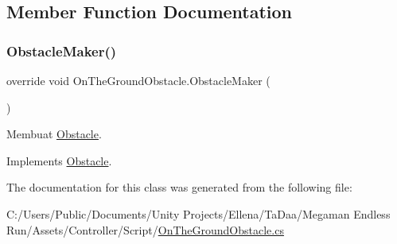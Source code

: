 \subsection{Member Function Documentation}
\hypertarget{class_on_the_ground_obstacle_a6c6123b29a6d6c2b78fa12ff72bf0834}{}\label{class_on_the_ground_obstacle_a6c6123b29a6d6c2b78fa12ff72bf0834} 
\subsubsection{\texorpdfstring{Obstacle\+Maker()}{ObstacleMaker()}}
{\footnotesize\ttfamily override void On\+The\+Ground\+Obstacle.\+Obstacle\+Maker (\begin{DoxyParamCaption}{ }\end{DoxyParamCaption})\hspace{0.3cm}{\ttfamily [virtual]}}



Membuat \hyperlink{class_obstacle}{Obstacle}. 



Implements \hyperlink{class_obstacle_a19f2f5d2c3176ee9ea8840862c55aa42}{Obstacle}.



The documentation for this class was generated from the following file\+:\begin{DoxyCompactItemize}
\item 
C\+:/\+Users/\+Public/\+Documents/\+Unity Projects/\+Ellena/\+Ta\+Daa/\+Megaman Endless Run/\+Assets/\+Controller/\+Script/\hyperlink{_on_the_ground_obstacle_8cs}{On\+The\+Ground\+Obstacle.\+cs}\end{DoxyCompactItemize}

